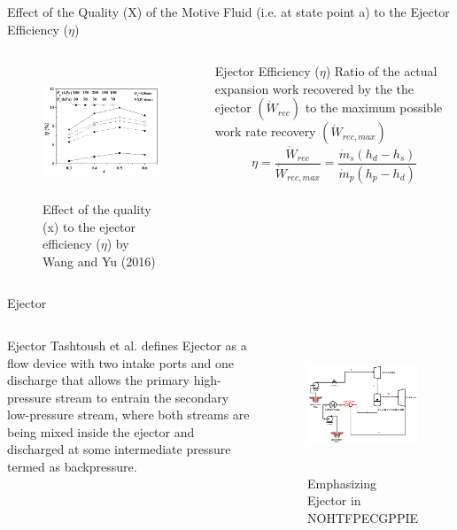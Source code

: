 \begin{frame}{Effect of the Quality (X) of the Motive Fluid (i.e. at state point a) to the Ejector Efficiency ($\eta$) \cite{wang2016experimental}}
\begin{columns}
    \begin{figure}[h]
      \centering
      \includegraphics[height=4cm]{images/partialevapejeceff.png}
      \caption{\scriptsize \centering Effect of the quality (x) to the ejector efficiency ($\eta$) by Wang and Yu (2016) \cite{wang2016experimental}}
   \end{figure}
    \begin{block}{Ejector Efficiency ($\eta$)}
    Ratio of the actual expansion work recovered by the the ejector $(\Dot W_{rec})$ to the maximum possible work rate recovery $(\Dot W_{rec,max})$
        \begin{equation}
            \eta = \frac{\Dot W_{rec}}{\Dot W_{rec,max}} = \frac{\Dot m_{s}(h_{d}-h_{s})}{\Dot m_{p}(h_{p}-h_{d})}
        \end{equation}
    \end{block}
\end{columns}
\end{frame}

\begin{frame}{Ejector}
\begin{columns}
  \begin{block}{Ejector}
   Tashtoush et al.\cite{tashtoush2019comprehensive} defines Ejector as a flow device with two intake ports and one discharge that allows the primary high-pressure stream to entrain the secondary low-pressure stream, where both streams are being mixed inside the ejector and discharged at some intermediate pressure termed as backpressure.
  \end{block}
  \begin{figure}[h]
   \centering
   \includegraphics[height=4cm]{images/nohtfpecgppieejector.png}
   \caption{Emphasizing Ejector in NOHTFPECGPPIE}
  \end{figure}
  \end{columns}
\end{frame}

